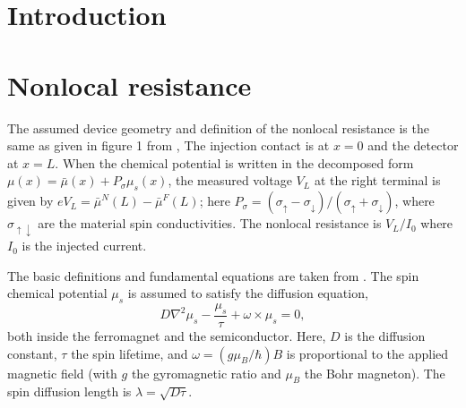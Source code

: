 \section{Introduction}

\section{Nonlocal resistance}

The assumed device geometry and definition of the nonlocal resistance
is the same as given in figure 1 from \cite{PhysRevB.67.052409},
The injection contact is at $x = 0$ and the detector at $x = L$.
When the chemical potential is written in the decomposed form
$μ(x) = \bar{μ} (x) + P_σ μ_s(x)$,
the measured voltage $V_L$ at the right terminal is given by
$e V_L = \bar{μ}^N (L) - \bar{μ}^F (L)$;
here $P_σ = \left( σ_↑ - σ_↓ \right) / \left( σ_↑ + σ_↓ \right)$,
where $σ_{↑↓}$ are the material spin conductivities.
The nonlocal resistance is $V_L / I_0$ where $I_0$ is the injected current.

The basic definitions and fundamental equations are taken from
\cite{ActaPhysicaSlovaca.57.4_5.565-907}.
The spin chemical potential $μ_s$ is assumed to satisfy the diffusion equation,
\begin{equation}
  \label{eq:diffusion}
  D ∇^2 μ_s - \frac{μ_s}{τ} + ω × μ_s = 0 ,
\end{equation}
both inside the ferromagnet and the semiconductor.
Here, $D$ is the diffusion constant, $τ$ the spin lifetime,
and $ω = \left( g μ_B / ℏ \right) B$ is proportional to the applied magnetic field
(with $g$ the gyromagnetic ratio and $μ_B$ the Bohr magneton).
The spin diffusion length is $λ = \sqrt{D τ}$.

